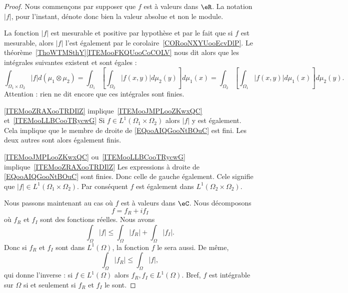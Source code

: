 \begin{proof}

	Nous commençons par supposer que \( f\) est à valeurs dans \( \eR\). La notation \( | f |\), pour l'instant,  dénote donc bien la valeur absolue et non le module.

	La fonction \( | f |\) est mesurable et positive par hypothèse et par le fait que si \( f\) est mesurable, alors \( | f |\) l'est également par le corolaire~\ref{CORooNXYUooEcvDlP}. Le théorème~\ref{ThoWTMSthY}\ref{ITEMooFKQUooCoCOLV} nous dit alors que les intégrales suivantes existent et sont égales :
	\begin{equation}        \label{EQooAIQGooNtBOuC}
		\int_{\Omega_1\times \Omega_2}| f |d(\mu_1\otimes \mu_2)=\int_{\Omega_1}\left[ \int_{\Omega_2}|f(x,y)|d\mu_2(y) \right]d\mu_1(x)
		=\int_{\Omega_2}\left[ \int_{\Omega_1}|f(x,y)|d\mu_1(x) \right]d\mu_2(y).
	\end{equation}
	Attention : rien ne dit encore que ces intégrales sont finies.

	\begin{subproof}
		\item[\ref{ITEMooZRAXooTRDIlZ} implique~\ref{ITEMooJMPLooZKwxQC} et~\ref{ITEMooLLBCooTRycwG}]
		Si \( f\in L^1(\Omega_1\times \Omega_2)\) alors \( | f |\) y est également. Cela implique que le membre de droite de \eqref{EQooAIQGooNtBOuC} est fini. Les deux autres sont alors également finis.
		\item[\ref{ITEMooJMPLooZKwxQC} ou~\ref{ITEMooLLBCooTRycwG} implique~\ref{ITEMooZRAXooTRDIlZ}]
		Les expressions à droite de \eqref{EQooAIQGooNtBOuC} sont finies. Donc celle de gauche également. Cele signifie que \( | f |\in L^1(\Omega_1\times \Omega_2)\). Par conséquent \( f\) est également dans \(L^1(\Omega_2\times \Omega_2) \).
	\end{subproof}

	Nous passons maintenant au cas où \( f\) est à valeurs dans \( \eC\). Nous décomposons
	\begin{equation}
		f=f_R+if_I
	\end{equation}
	où \( f_R\) et \( f_I\) sont des fonctions réelles. Nous avons
	\begin{equation}        \label{EQooZEOAooIMwKwk}
		\int_{\Omega}| f |\leq \int_{\Omega}| f_R |+\int_{\Omega}| f_I |.
	\end{equation}
	Donc si \( f_R\) et \( f_I\) sont dans \( L^1(\Omega)\), la fonction \( f\) le sera aussi. De même,
	\begin{equation}
		\int_{\Omega}| f_R |\leq \int_{\Omega}| f |,
	\end{equation}
	qui donne l'inverse : si \( f\in L^1(\Omega)\) alors \( f_R,f_I\in L^1(\Omega)\). Bref, \( f\) est intégrable sur \( \Omega\) si et seulement si \( f_R\) et \( f_I\) le sont.


\end{proof}
